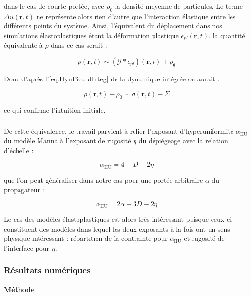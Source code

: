 \noindent dans le cas de courte portée, avec $\rho_0$ la densité moyenne de particules. Le terme $\Delta u(\mathbf{r},t)$ ne représente alors rien d'autre que l'interaction élastique entre les différents points du système. Ainsi, l'équivalent du déplacement dans nos simulations élastoplastiques étant la déformation plastique $
\epsilon_{pl}(\mathbf{r},t)$, la quantité équivalente à $\rho$ dans ce cas serait :

\begin{equation}
	\rho (\mathbf{r},t) \sim \left(\mathcal{G}\ast\epsilon_{pl}\right)(\mathbf{r},t)+ \rho_0
\end{equation}

\noindent Donc d'après l'\autoref{eq:DynPicardInteg} de la dynamique intégrée on aurait :

\begin{equation}
	\rho (\mathbf{r},t) - \rho_0 \sim \sigma (\mathbf{r},t)- \Sigma
\end{equation}

\noindent ce qui confirme l'intuition initiale.

\subparagraph{}De cette équivalence, le travail \cite{wiese_hyperuniformity_2024} parvient à relier l'exposant d'hyperuniformité $\alpha_\text{HU}$ du modèle Manna à l'exposant de rugosité $\eta$ du dépiégeage avec la relation d'échelle :

\begin{equation}
	\alpha_\text{HU} = 4 - D - 2\eta
\end{equation}

\noindent que l'on peut généraliser dans notre cas pour une portée arbitraire $\alpha$ du propagateur :

\begin{equation}
	\alpha_\text{HU} = 2\alpha - 3D - 2\eta
	\label{eq:scalingHULP}
\end{equation}

\noindent Le cas des modèles élastoplastiques est alors très intéressant puisque ceux-ci constituent des modèles dans lequel les deux exposants à la fois ont un sens physique intéressant :  répartition de la contrainte pour $\alpha_\text{HU}$ et rugosité de l'interface pour $\eta$.

\subsubsection{Résultats numériques}

\label{sec:HUEPM}

\paragraph{Méthode}

